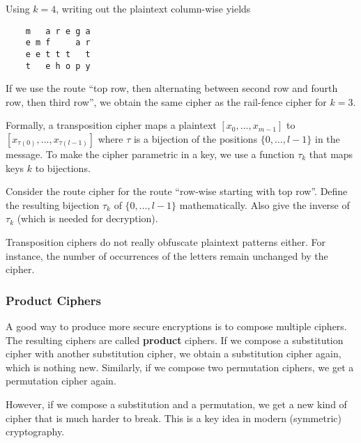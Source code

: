 \begin{example}
Using $k=4$, writing out the plaintext column-wise yields
  \begin{lstlisting}
    m   a r e g a
    e m f     a r
    e e t t t   t
    t   e h o p y
  \end{lstlisting}

If we use the route ``top row, then alternating between second row and fourth row, then third row'', we obtain the same cipher as the rail-fence cipher for $k=3$.
\end{example}

Formally, a transposition cipher maps a plaintext $[x_0,\ldots,x_{m-1}]$ to $[x_{\tau(0)},\ldots,x_{\tau(l-1)}]$ where $\tau$ is a bijection of the positions $\{0,\ldots,l-1\}$ in the message.
To make the cipher parametric in a key, we use a function $\tau_k$ that maps keys $k$ to bijections.

\begin{exercise}\label{exc:sd:route}
Consider the route cipher for the route ``row-wise starting with top row''.
Define the resulting bijection $\tau_k$ of $\{0,\ldots,l-1\}$ mathematically.
Also give the inverse of $\tau_k$ (which is needed for decryption).
\end{exercise}

Transposition ciphers do not really obfuscate plaintext patterns either.
For instance, the number of occurrences of the letters remain unchanged by the cipher.

\subsubsection{Product Ciphers}
 
A good way to produce more secure encryptions is to compose multiple ciphers.
The resulting ciphers are called \textbf{product} ciphers.
If we compose a substitution cipher with another substitution cipher, we obtain a substitution cipher again, which is nothing new.
Similarly, if we compose two permutation ciphers, we get a permutation cipher again.

However, if we compose a substitution and a permutation, we get a new kind of cipher that is much harder to break.
This is a key idea in modern (symmetric) cryptography. 
